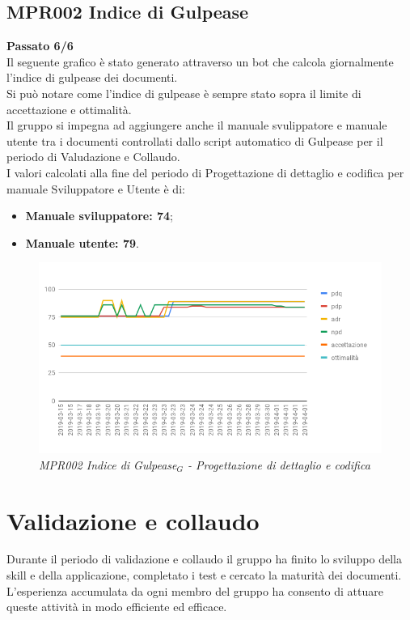 \subsection{MPR002 Indice di Gulpease}
\textbf{Passato 6/6}\\
Il seguente grafico è stato generato attraverso un bot che calcola giornalmente l'indice di gulpease dei documenti.\\
Si può notare come l'indice di gulpease è sempre stato sopra il limite di accettazione e ottimalità.\\
Il gruppo si impegna ad aggiungere anche il manuale svulippatore e manuale utente tra i documenti controllati dallo script automatico di Gulpease per il periodo di Valudazione e Collaudo.\\I valori calcolati alla fine del periodo di Progettazione di dettaglio e codifica per manuale Sviluppatore e Utente è di:
\begin{itemize}
	\item \textbf{Manuale sviluppatore: 74};
	\item \textbf{Manuale utente: 79}.
\end{itemize}
\begin{figure} [H]
    \centering
	\includegraphics[scale=0.5]{./images/gulpeasePDC.png}
    \caption{\textit{MPR002 \textit{Indice di Gulpease$_{G}$} - Progettazione di dettaglio e codifica}}
\end{figure}






\section{Validazione e collaudo}
Durante il periodo di validazione e collaudo il gruppo ha finito lo sviluppo della skill e della applicazione, completato i test e cercato la maturità dei documenti. L'esperienza accumulata da ogni membro del gruppo ha consento di attuare queste attività in modo efficiente ed efficace.\\
